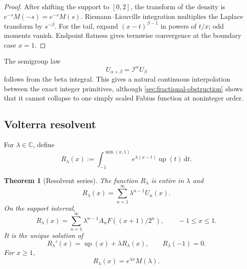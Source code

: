 \documentclass[11pt]{article}
\newtheorem{theorem}{Theorem}[section]
\theoremstyle{definition}
\theoremstyle{remark}
\DeclareMathOperator{\upf}{up}
\newcommand{\C}{\mathbb C}
\newcommand{\dd}{\,\mathrm d}
\newcommand{\Iop}{\mathcal I}
\begin{document}
\begin{proof}
After shifting the support to \([0,2]\), the transform of the density is
\(e^{-s}M(-s)=e^{-s}M(s)\).  Riemann--Liouville integration multiplies the Laplace
transform by \(s^{-\beta}\).  For the tail, expand
\((x-t)^{\beta-1}\) in powers of \(t/x\); odd moments vanish.  Endpoint flatness gives
termwise convergence at the boundary case \(x=1\).
\end{proof}

The semigroup law
\begin{equation}
 U_{\alpha+\beta}=\Iop^\alpha U_\beta                 \label{eq:fractional-semigroup}
\end{equation}
follows from the beta integral.  This gives a natural continuous interpolation between
the exact integer primitives, although \cref{sec:fractional-obstruction} shows that it
cannot collapse to one simply scaled Fabius function at noninteger order.

\subsection{Volterra resolvent}

For \(\lambda\in\C\), define
\begin{equation}
 R_\lambda(x):=\int_{-1}^{\min(x,1)}e^{\lambda(x-t)}\upf(t)\dd t. \label{eq:resolvent-def}
\end{equation}

\begin{theorem}[Resolvent series]
\label{thm:resolvent}
The function \(R_\lambda\) is entire in \(\lambda\) and
\begin{equation}
 R_\lambda(x)=\sum_{n=1}^{\infty}\lambda^{n-1}U_n(x).     \label{eq:resolvent-series}
\end{equation}
On the support interval,
\begin{equation}
 R_\lambda(x)=\sum_{n=1}^{\infty}\lambda^{n-1}
 A_nF((x+1)/2^n),\qquad -1\le x\le1.                     \label{eq:resolvent-F-series}
\end{equation}
It is the unique solution of
\begin{equation}
 R_\lambda'(x)=\upf(x)+\lambda R_\lambda(x),\qquad R_\lambda(-1)=0. \label{eq:resolvent-ode}
\end{equation}
For \(x\ge1\),
\begin{equation}
 R_\lambda(x)=e^{\lambda x}M(\lambda).                   \label{eq:resolvent-tail}
\end{equation}
\end{theorem}
\end{document}
